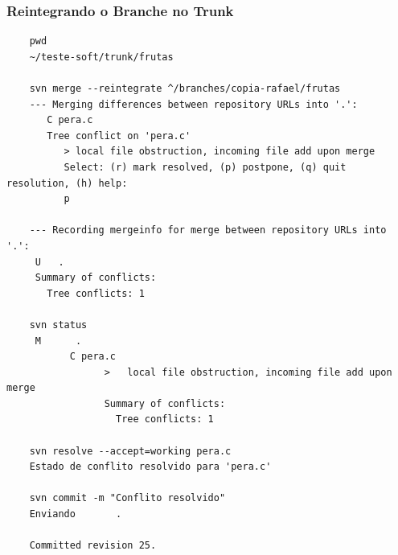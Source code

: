 \documentclass{beamer}
\begin{document}
\begin{frame}[fragile]
    \frametitle{Reintegrando o Branche no Trunk}

    \begin{bash}{}
    {\tiny
    \begin{verbatim}
    pwd
    ~/teste-soft/trunk/frutas

    svn merge --reintegrate ^/branches/copia-rafael/frutas
    --- Merging differences between repository URLs into '.':
       C pera.c
       Tree conflict on 'pera.c'
          > local file obstruction, incoming file add upon merge
          Select: (r) mark resolved, (p) postpone, (q) quit resolution, (h) help: 
          p

    --- Recording mergeinfo for merge between repository URLs into '.':
     U   .
     Summary of conflicts:
       Tree conflicts: 1

    svn status
     M      .
           C pera.c
                 >   local file obstruction, incoming file add upon merge
                 Summary of conflicts:
                   Tree conflicts: 1

    svn resolve --accept=working pera.c
    Estado de conflito resolvido para 'pera.c'

    svn commit -m "Conflito resolvido"
    Enviando       .

    Committed revision 25.
    \end{verbatim}
    }
    \end{bash}

\end{frame}
\end{document}

